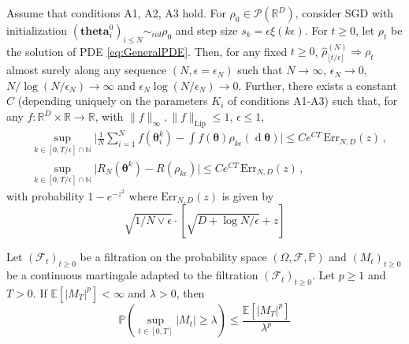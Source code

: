 \documentclass{article}
\theoremstyle{mystyle}
\newcommand{\N}{\ensuremath{\mathbb{N}}}
\newcommand{\R}{\ensuremath{\mathbb{R}}}
\newcommand{\PP}{\ensuremath{\mathbb{P}}}
\newcommand{\F}{\mathcal{F}}
\newcommand{\diff}{\ensuremath{\operatorname{d}\!}}
\begin{document}
\begin{theorem}[PM. Nguyen et al. (2018)]\label{thm: mean field nguyen}
Assume that conditions {\sf A1}, {\sf A2}, {\sf A3} hold.
For $\rho_0\in\mathcal{P}(\R^D)$, consider SGD with initialization $(\mathbf{theta}^0_i)_{i\leq N}\sim_{iid}\rho_0$ and step size $s_k = \epsilon \xi(k \epsilon)$. For $t\geq 0$, let $\rho_t$ be the solution of PDE \ref{eq:GeneralPDE}.
Then, for any fixed $t \geq 0$,  $\hat{\rho}^{(N)}_{\lfloor t / \epsilon \rfloor} \Rightarrow \rho_{t}$ almost surely along any sequence $(N,\epsilon = \epsilon_N)$ such that $N \to \infty$, $\epsilon_N \to 0$, $N/\log (N/\epsilon_N) \to\infty$ and $\epsilon_N \log(N / \epsilon_N)\to 0$.
Further, there exists a constant $C$  (depending uniquely on the parameters $K_i$ of conditions {\sf A1}-{\sf A3}) such that,
for any $f:\R^D\times \R\to\R$, with $\|f\|_{\infty}, \|f\|_{\text{Lip}}\leq 1$, $\epsilon\leq 1$,
%
\begin{align}\label{eq: big theorem nguyen}
%
&\sup_{k \in  [0, T/\epsilon] \cap \N}\Big|\frac{1}{N}\sum_{i=1}^N f(\mathbf{\theta}^{k}_i)- \int\!
  f(\mathbf{\theta})  \rho_{k\epsilon}(\diff \mathbf{\theta}) \Big| \leq Ce^{CT}\,\text{Err}_{N,D}(z)\, ,\nonumber\\
&\sup_{k \in  [0, T/\epsilon] \cap \N}\big|R_{N}(\mathbf{\theta}^{k})-R(\rho_{k\epsilon})\big| \leq Ce^{CT}\,\text{Err}_{N,D}(z)\, ,
%
\end{align} 
%
with probability $1- e^{-z^2}$ where $\text{Err}_{N,D}(z)$ is given by
\begin{equation}
	\sqrt{1/N\lor \epsilon}\cdot \left[ \sqrt{D + \log N/\epsilon}+z \right]
\end{equation}

\end{theorem}


\begin{theorem}\label{thm: Doob}
	Let $ (\F_{t})_{t\geq 0}$ be a filtration on the probability space $ (\Omega, \F, \PP)$ and $ (M_{t})_{t\geq 0}$ be a continuous martingale adapted to the filtration $ (\F_{t})_{t\geq 0}$. Let $ p\geq 1$ and $ T>0$. If $\mathbb{E}[|M_{T}|^{p}]<\infty$ and $ \lambda > 0$, then 
	\begin{equation}
		\PP\left(\displaystyle\sup_{t\in [0,T]}|M_{t}|\geq \lambda\right)\leq \frac{\mathbb{E}[|M_{T}|^{p}]}{\lambda^{p}}
	\end{equation}
	
\end{theorem}
\end{document}
